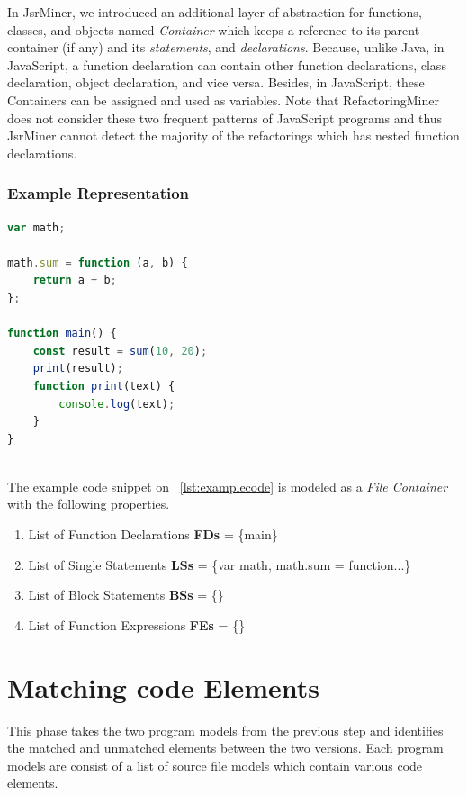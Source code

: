 \documentclass[letterpaper,12pt,onecolumn,final]{report}
\begin{document}
In JsrMiner, we introduced an additional layer of abstraction for functions, classes, and objects named \textit{Container} which keeps a reference to its parent container (if any) and its \textit{statements}, and \textit{declarations}. Because, unlike Java, in JavaScript, a function declaration can contain other function declarations, class declaration, object declaration, and vice versa. Besides, in JavaScript, these Containers can be assigned and used as variables. Note that RefactoringMiner does not consider these two frequent patterns of JavaScript programs and thus JsrMiner cannot detect the majority of the refactorings which has nested function declarations.



\subsubsection *{Example Representation}

\begin{lstlisting}[language=JavaScript, caption=Example JavaScript Code Snippet, numbers=none, label={lst:examplecode}]
var math;

math.sum = function (a, b) {
    return a + b;
};

function main() {
    const result = sum(10, 20);
    print(result);
    function print(text) {
        console.log(text);
    }
}



\end{lstlisting}
\label{fig:jobInformationDialog}

The example code snippet on ~\ref{lst:examplecode} is modeled as a \textit{File Container} with the following properties.

\begin{enumerate}
\item List of Function Declarations \textbf{FDs} = \{main\}
\item List of Single Statements \textbf{LSs} = \{var math, math.sum = function...\}
\item List of Block Statements \textbf{BSs} = \{\}
\item List of Function Expressions \textbf{FEs} = \{\}
\end{enumerate}

\section {Matching code Elements}
This phase takes the two program models from the previous step and identifies the matched and unmatched elements between the two versions. Each program models are consist of a list of source file models which contain various code elements.
\end{document}
